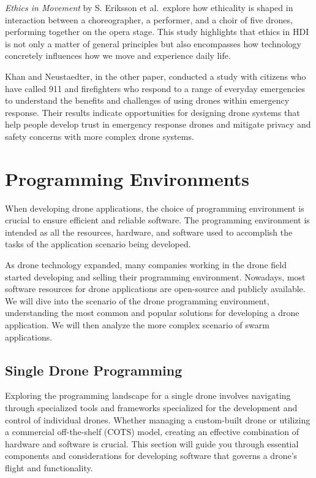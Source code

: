 \textit{Ethics in Movement} by S. Eriksson et al.\ explore how ethicality is shaped in interaction between a choreographer, a performer, and a choir of five drones, performing together on the opera stage.
This study highlights that ethics in HDI is not only a matter of general principles but also encompasses how technology concretely influences how we move and experience daily life.

Khan and Neustaedter, in the other paper, conducted a study with citizens who have called 911 and firefighters who respond to a range of everyday emergencies to understand the benefits and challenges of using drones within emergency response.
Their results indicate opportunities for designing drone systems that help people develop trust in emergency response drones and mitigate privacy and safety concerns with more complex drone systems.


\section{Programming Environments}\label{sec:soa_programming_environments}
When developing drone applications, the choice of programming environment is crucial to ensure efficient and reliable software.
The programming environment is intended as all the resources, hardware, and software used to accomplish the tasks of the 
application scenario being developed.

As drone technology expanded, many companies working in the drone field started developing and selling their programming environment. 
Nowadays, most software resources for drone applications are open-source and publicly available. 
We will dive into the scenario of the drone programming environment, understanding the most common and popular solutions 
for developing a drone application. We will then analyze the more complex scenario of swarm applications.

\subsection{Single Drone Programming}\label{subsec:programming_environments_single}
Exploring the programming landscape for a single drone involves navigating through specialized tools and 
frameworks specialized for the development and control of individual drones. 
Whether managing a custom-built drone or utilizing a commercial off-the-shelf (COTS) model, 
creating an effective combination of hardware and software is crucial. 
This section will guide you through essential components and considerations for developing software that governs a 
drone's flight and functionality.

